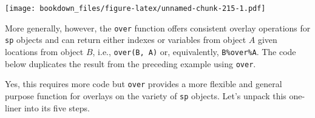 \documentclass[]{krantz}
\makeatletter
\newenvironment{Shaded}{\begin{snugshade}}{\end{snugshade}}
\newcommand{\KeywordTok}[1]{\textcolor[rgb]{0.27,0.27,0.27}{\textbf{#1}}}
\newcommand{\StringTok}[1]{\textcolor[rgb]{0.5,0.5,0.5}{#1}}
\newcommand{\OperatorTok}[1]{\textcolor[rgb]{0.43,0.43,0.43}{\textbf{#1}}}
\newcommand{\NormalTok}[1]{#1}
\newenvironment{kframe}{%
\medskip{}
\setlength{\fboxsep}{.8em}
 \def\at@end@of@kframe{}%
 \ifinner\ifhmode%
  \def\at@end@of@kframe{\end{minipage}}%
  \begin{minipage}{\columnwidth}%
 \fi\fi%
 \def\FrameCommand##1{\hskip\@totalleftmargin \hskip-\fboxsep
 \colorbox{shadecolor}{##1}\hskip-\fboxsep
     \hskip-\linewidth \hskip-\@totalleftmargin \hskip\columnwidth}%
 \MakeFramed {\advance\hsize-\width
   \@totalleftmargin\z@ \linewidth\hsize
   \@setminipage}}%
 {\par\unskip\endMakeFramed%
 \at@end@of@kframe}
\renewenvironment{Shaded}{\begin{kframe}}{\end{kframe}}
\makeatother
\begin{document}
\texttt{[image: bookdown\_files/figure-latex/unnamed-chunk-215-1.pdf]}

More generally, however, the \texttt{over} function offers consistent
overlay operations for \texttt{sp} objects and can return either indexes
or variables from object \(A\) given locations from object \(B\), i.e.,
\texttt{over(B,\ A)} or, equivalently, \texttt{B\%over\%A}. The code
below duplicates the result from the preceding example using
\texttt{over}.

\begin{Shaded}
\end{Shaded}

Yes, this requires more code but \texttt{over} provides a more flexible
and general purpose function for overlays on the variety of \texttt{sp}
objects. Let's unpack this one-liner into its five steps.

\begin{Shaded}
\end{Shaded}
\end{document}
